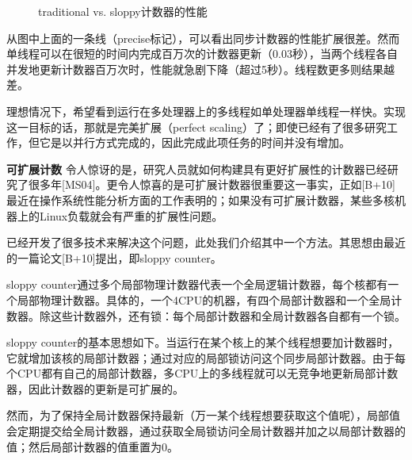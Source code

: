 \begin{figure}[h]
\caption{traditional vs. sloppy计数器的性能}
\end{figure}

从图中上面的一条线（precise标记），可以看出同步计数器的性能扩展很差。然而单线程可以在很短的时间内完成百万次的计数器更新（0.03秒），当两个线程各自并发地更新计数器百万次时，性能就急剧下降（超过5秒）。线程数更多则结果越差。

理想情况下，希望看到运行在多处理器上的多线程如单处理器单线程一样快。实现这一目标的话，那就是完美扩展（perfect scaling）了；即使已经有了很多研究工作，但它是以并行方式完成的，因此完成此项任务的时间并没有增加。


\textbf{可扩展计数}
令人惊讶的是，研究人员就如何构建具有更好扩展性的计数器已经研究了很多年[MS04]。更令人惊喜的是可扩展计数器很重要这一事实，正如[B+10]最近在操作系统性能分析方面的工作表明的；如果没有可扩展计数器，某些多核机器上的Linux负载就会有严重的扩展性问题。

已经开发了很多技术来解决这个问题，此处我们介绍其中一个方法。其思想由最近的一篇论文[B+10]提出，即sloppy counter。

sloppy counter通过多个局部物理计数器代表一个全局逻辑计数器，每个核都有一个局部物理计数器。具体的，一个4CPU的机器，有四个局部计数器和一个全局计数器。除这些计数器外，还有锁：每个局部计数器和全局计数器各自都有一个锁。

sloppy counter的基本思想如下。当运行在某个核上的某个线程想要加计数器时，它就增加该核的局部计数器；通过对应的局部锁访问这个同步局部计数器。由于每个CPU都有自己的局部计数器，多CPU上的多线程就可以无竞争地更新局部计数器，因此计数器的更新是可扩展的。

然而，为了保持全局计数器保持最新（万一某个线程想要获取这个值呢），局部值会定期提交给全局计数器，通过获取全局锁访问全局计数器并加之以局部计数器的值；然后局部计数器的值重置为0。

